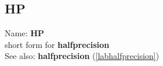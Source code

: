 \subsection{HP}
\label{labhp}
\noindent Name: \textbf{HP}\\
short form for \textbf{halfprecision}\\
See also: \textbf{halfprecision} (\ref{labhalfprecision})
